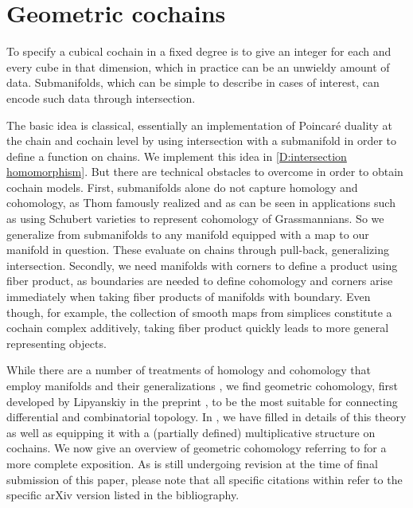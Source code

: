 
\section{Geometric cochains}\label{S:geometric cochains}

To specify a cubical cochain in a fixed degree is to give an integer for each and every cube in that dimension, which in practice can be an unwieldy amount of data.
Submanifolds, which can be simple to describe in cases of interest, can encode such data through intersection.

The basic idea is classical, essentially an implementation of Poincar\'e duality at the chain and cochain level by using intersection with a submanifold in order to define a function on chains.
We implement this idea in \cref{D:intersection homomorphism}.
But there are technical obstacles to overcome in order to obtain cochain models.
First, submanifolds alone do not capture homology and cohomology, as Thom famously realized and as can be seen in applications such as using Schubert varieties to represent cohomology of Grassmannians.
So we generalize from submanifolds to any manifold equipped with a map to our manifold in question.
These evaluate on chains through pull-back, generalizing intersection.
Secondly, we need manifolds with corners to define a product using fiber product, as boundaries are needed to define cohomology and corners arise immediately when taking fiber products of manifolds with boundary.
Even though, for example, the collection of smooth maps from simplices constitute a cochain complex additively, taking fiber product quickly leads to more general representing objects.

While there are a number of treatments of homology and cohomology that employ manifolds and their generalizations \cite{Whit47, BRS76, FeSj83, Krec10, Kahn01, Zing08, Joyc15}, we find {geometric cohomology}, first developed by Lipyanskiy in the preprint \cite{Lipy14}, to be the most suitable for connecting differential and combinatorial topology.
In \cite{medina2022foundations}, we have filled in details of this theory as well as equipping it with a (partially defined) multiplicative structure on cochains.
We now give an overview of geometric cohomology referring to \cite{medina2022foundations} for a more complete exposition.
As \cite{medina2022foundations} is still undergoing revision at the time of final submission of this paper, please note that all specific citations within \cite{medina2022foundations} refer to the specific arXiv version listed in the bibliography.

